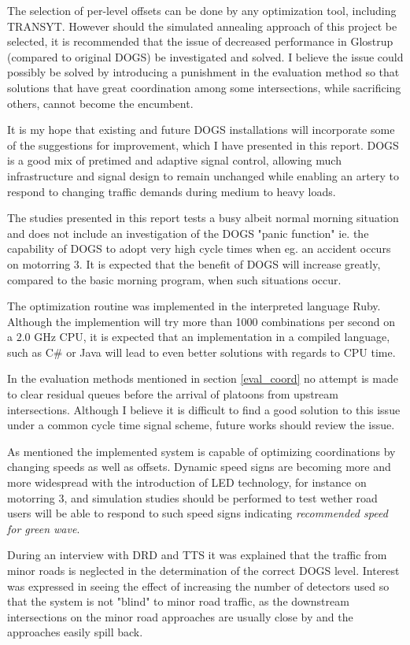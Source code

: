 The selection of per-level offsets can be done by any optimization tool, including TRANSYT. However should the simulated annealing approach of this project be selected, it is recommended that the issue of decreased performance in Glostrup (compared to original DOGS) be investigated and solved. I believe the issue could possibly be solved by introducing a punishment in the evaluation method so that solutions that have great coordination among some intersections, while sacrificing others, cannot become the encumbent.

It is my hope that existing and future DOGS installations will incorporate some of the suggestions for improvement, which I have presented in this report. DOGS is a good mix of pretimed and adaptive signal control, allowing much infrastructure and signal design to remain unchanged while enabling an artery to respond to changing traffic demands during medium to heavy loads.

The studies presented in this report tests a busy albeit normal morning situation and does not include an investigation of the DOGS "panic function" ie. the capability of DOGS to adopt very high cycle times when eg. an accident occurs on motorring 3. It is expected that the benefit of DOGS will increase greatly, compared to the basic morning program, when such situations occur.

The optimization routine was implemented in the interpreted language Ruby. Although the implemention will try more than 1000 combinations per second on a $2.0$ GHz CPU, it is expected that an implementation in a compiled language, such as C\# or Java will lead to even better solutions with regards to CPU time.

In the evaluation methods mentioned in section \ref{eval_coord} no attempt is made to clear residual queues before the arrival of platoons from upstream intersections. Although I believe it is difficult to find a good solution to this issue under a common cycle time signal scheme, future works should review the issue.

As mentioned the implemented system is capable of optimizing coordinations by changing speeds as well as offsets. Dynamic speed signs are becoming more and more widespread with the introduction of LED technology, for instance on motorring 3, and simulation studies should be performed to test wether road users will be able to respond to such speed signs indicating \textit{recommended speed for green wave}.

During an interview with DRD and TTS it was explained that the traffic from minor roads is neglected in the determination of the correct DOGS level. Interest was expressed in seeing the effect of increasing the number of detectors used so that the system is not "blind" to minor road traffic, as the downstream intersections on the minor road approaches are usually close by and the approaches easily spill back.

